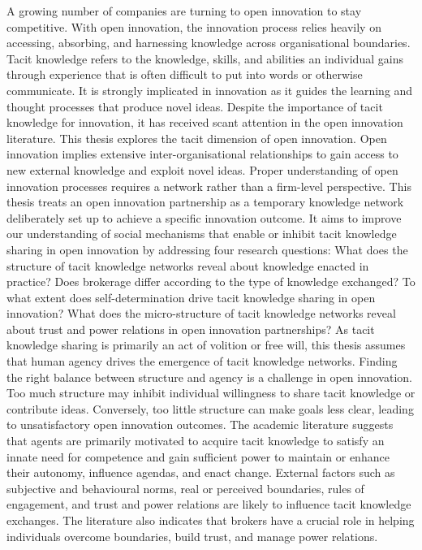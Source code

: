 \documentclass[12pt,table]{book}
\begin{document}
A growing number of companies are turning to open innovation to stay competitive. With open innovation, the innovation process relies heavily on accessing, absorbing, and harnessing knowledge across organisational boundaries. Tacit knowledge refers to the knowledge, skills, and abilities an individual gains through experience that is often difficult to put into words or otherwise communicate. It is strongly implicated in innovation as it guides the learning and thought processes that produce novel ideas. Despite the importance of tacit knowledge for innovation, it has received scant attention in the open innovation literature. This thesis explores the tacit dimension of open innovation. \medskip
\noindent
Open innovation implies extensive inter-organisational relationships to gain access to new external knowledge and exploit novel ideas. Proper understanding of open innovation processes requires a network rather than a firm-level perspective. This thesis treats an open innovation partnership as a temporary knowledge network deliberately set up to achieve a specific innovation outcome. It aims to improve our understanding of social mechanisms that enable or inhibit tacit knowledge sharing in open innovation by addressing four research questions: What does the structure of tacit knowledge networks reveal about knowledge enacted in practice? Does brokerage differ according to the type of knowledge exchanged? To what extent does self-determination drive tacit knowledge sharing in open innovation? What does the micro-structure of tacit knowledge networks reveal about trust and power relations in open innovation partnerships? \medskip
\noindent
As tacit knowledge sharing is primarily an act of volition or free will, this thesis assumes that human agency drives the emergence of tacit knowledge networks. Finding the right balance between structure and agency is a challenge in open innovation. Too much structure may inhibit individual willingness to share tacit knowledge or contribute ideas. Conversely, too little structure can make goals less clear, leading to unsatisfactory open innovation outcomes. The academic literature suggests that agents are primarily motivated to acquire tacit knowledge to satisfy an innate need for competence and gain sufficient power to maintain or enhance their autonomy, influence agendas, and enact change. External factors such as subjective and behavioural norms, real or perceived boundaries, rules of engagement, and trust and power relations are likely to influence tacit knowledge exchanges. The literature also indicates that brokers have a crucial role in helping individuals overcome boundaries, build trust, and manage power relations. \medskip
\end{document}
